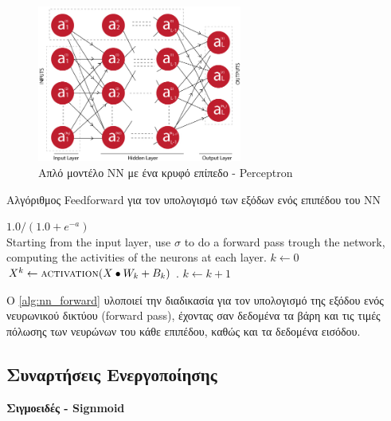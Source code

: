 \begin{figure}[!ht]
  \centering
  \includegraphics[width=0.6\textwidth]{./images/chapter3/multilayer_nn.jpg}
  \caption[Απλό μοντέλο NN με ένα κρυφό επίπεδο - Perceptron]{Απλό μοντέλο NN με ένα κρυφό επίπεδο - Perceptron}
  \label{fig:multilayer_nn}
\end{figure}

\begin{algorithm}[!htp]
  \caption{Αλγόριθμος Feedforward για τον υπολογισμό των εξόδων ενός επιπέδου του ΝΝ}
  \label{alg:nn_forward}
  \begin{algorithmic}[1]
      \State \Return $1.0 / (1.0 + e^{-a})$
    \EndFunction \\
      \State Starting from the input layer, use $\sigma$ to do
         a forward pass trough the network, computing the activities of the
        neurons at each layer.
      \State $k \gets 0$
      \State $X^{k} \gets \Call{activation}{X \bullet W_{k} + B_{k}}$  .
        \State $k \gets k+1$
      \EndWhile
    \EndProcedure
  \end{algorithmic}
\end{algorithm}

Ο \autoref{alg:nn_forward} υλοποιεί την διαδικασία για τον υπολογισμό της εξόδου
ενός νευρωνικού δικτύου (forward pass), έχοντας σαν δεδομένα τα βάρη και τις τιμές πόλωσης
των νευρώνων του κάθε επιπέδου, καθώς και τα δεδομένα εισόδου.


\subsection{Συναρτήσεις Ενεργοποίησης}

\textbf{Σιγμοειδές - Signmoid}

